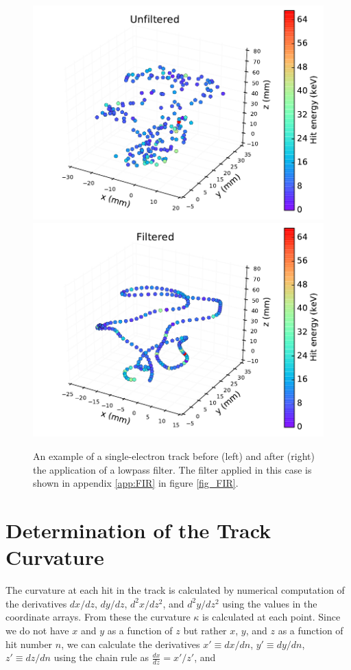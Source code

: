 \documentclass{JINST}
\begin{document}
\begin{figure}[!htb]
	\centering
	\includegraphics[scale=0.48]{fig/plt_trk_unflt_nmagse2_6.pdf}
	\includegraphics[scale=0.48]{fig/plt_trk_flt_nmagse2_6.pdf}
	\caption{\label{fig_flt}An example of a single-electron track before (left) and after (right) the application of a lowpass filter.  The filter applied in this case is shown in appendix \protect\ref{app:FIR} in figure \protect\ref{fig_FIR}.}
\end{figure}

\section{Determination of the Track Curvature}\label{ssec:curvature}
The curvature at each hit in the track is calculated by numerical computation of the derivatives $dx/dz$, $dy/dz$, $d^2x/dz^2$, and $d^2y/dz^2$ using the values in the coordinate arrays.  From these the curvature $\kappa$ is calculated at each point.  Since we do not have $x$ and $y$ as a function of $z$ but rather $x$, $y$, and $z$ as a function of hit number $n$, we can calculate the derivatives $x' \equiv dx/dn$, $y' \equiv dy/dn$, $z' \equiv dz/dn$ using the chain rule as $\frac{dx}{dz} = x'/z'$, and
\end{document}
